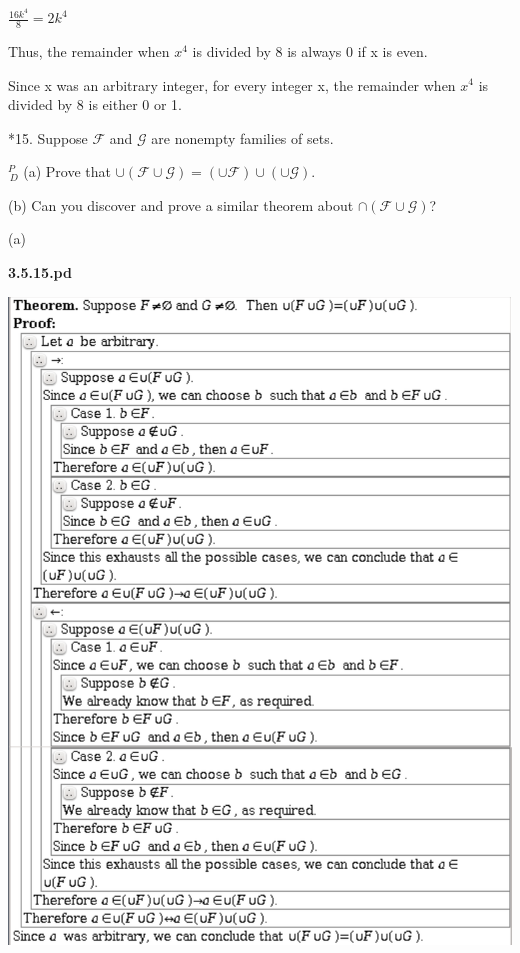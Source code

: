 \documentclass{article}
\begin{document}
$\frac{16k^4}{8} = 2k^4$

Thus, the remainder when $x^4$ is divided by 8 is always 0 if x is even.

Since x was an arbitrary integer, for every integer x, the remainder when $x^4$ is divided by 8 is either 0 or 1.

\vspace{30pt}

*15. Suppose $\mathcal{F}$ and $\mathcal{G}$ are nonempty families of sets.

\hspace{12pt}$^{\textit{P}}_{\, \textit{D}}$ (a) Prove that $\cup(\mathcal{F} \cup \mathcal{G}) = (\cup\mathcal{F}) \cup (\cup\mathcal{G})$.

\hspace{12pt}(b) Can you discover and prove a similar theorem about $\cap(\mathcal{F} \cup \mathcal{G})$?

\vspace{30pt}

(a)

\textbf{3.5.15.pd}
\vspace{10pt}

\includegraphics[scale=0.15]{3_5_15}
\end{document}
